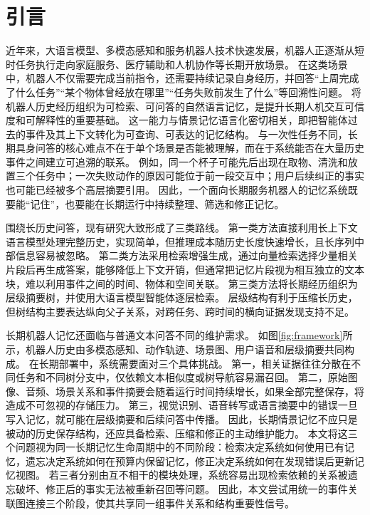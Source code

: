 \documentclass{cjc}
\begin{document}
\maketitle

\section{引言}

近年来，大语言模型、多模态感知和服务机器人技术快速发展，机器人正逐渐从短时任务执行走向家庭服务、医疗辅助和人机协作等长期开放场景\cite{siciliano2016robotics,vaswani2017attention,brown2020gpt3,achiam2023gpt4,reid2024gemini}。
在这类场景中，机器人不仅需要完成当前指令，还需要持续记录自身经历，并回答“上周完成了什么任务”“某个物体曾经放在哪里”“任务失败前发生了什么”等回溯性问题。
将机器人历史经历组织为可检索、可问答的自然语言记忆，是提升长期人机交互可信度和可解释性的重要基础。
这一能力与情景记忆语言化密切相关，即把智能体过去的事件及其上下文转化为可查询、可表达的记忆结构\cite{tulving1972episodic,barmann2025episodic}。
与一次性任务不同，长期具身问答的核心难点不在于单个场景是否能被理解，而在于系统能否在大量历史事件之间建立可追溯的联系。
例如，同一个杯子可能先后出现在取物、清洗和放置三个任务中；一次失败动作的原因可能位于前一段交互中；用户后续纠正的事实也可能已经被多个高层摘要引用。
因此，一个面向长期服务机器人的记忆系统既要能“记住”，也要能在长期运行中持续整理、筛选和修正记忆。

围绕长历史问答，现有研究大致形成了三类路线。
第一类方法直接利用长上下文语言模型处理完整历史\cite{brown2020gpt3,achiam2023gpt4,gemini2023gemini,reid2024gemini}，实现简单，但推理成本随历史长度快速增长，且长序列中部信息容易被忽略\cite{liu2024lost}。
第二类方法采用检索增强生成，通过向量检索选择少量相关片段后再生成答案\cite{lewis2020rag,karpukhin2020dpr,reimers2019sbert,johnson2019faiss,nogueira2019reranking,gao2023hyde}，能够降低上下文开销，但通常把记忆片段视为相互独立的文本块，难以利用事件之间的时间、物体和空间关联。
第三类方法将长期经历组织为层级摘要树，并使用大语言模型智能体逐层检索\cite{barmann2025episodic,plewnia2025combining}。
层级结构有利于压缩长历史，但树结构主要表达纵向父子关系，对跨任务、跨时间的横向证据发现支持不足。

长期机器人记忆还面临与普通文本问答不同的维护需求。
如图\ref{fig:framework}所示，机器人历史由多模态感知、动作轨迹、场景图、用户语音和层级摘要共同构成。
在长期部署中，系统需要面对三个具体挑战。
第一，相关证据往往分散在不同任务和不同树分支中，仅依赖文本相似度或树导航容易漏召回。
第二，原始图像、音频、场景关系和事件摘要会随着运行时间持续增长，如果全部完整保存，将造成不可忽视的存储压力。
第三，视觉识别、语音转写或语言摘要中的错误一旦写入记忆，就可能在层级摘要和后续问答中传播。
因此，长期情景记忆不应只是被动的历史保存结构，还应具备检索、压缩和修正的主动维护能力。
本文将这三个问题视为同一长期记忆生命周期中的不同阶段：检索决定系统如何使用已有记忆，遗忘决定系统如何在预算内保留记忆，修正决定系统如何在发现错误后更新记忆视图。
若三者分别由互不相干的模块处理，系统容易出现检索依赖的关系被遗忘破坏、修正后的事实无法被重新召回等问题。
因此，本文尝试用统一的事件关联图连接三个阶段，使其共享同一组事件关系和结构重要性信号。
\end{document}
